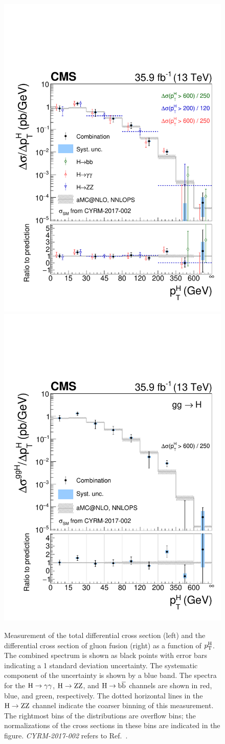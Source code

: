 \begin{figure}[hbtp]
  \begin{center}
    \includegraphics[width=0.49\linewidth]{img/differentials/spectra_pth_smH.pdf}
    \includegraphics[width=0.49\linewidth]{img/differentials/spectra_pth_ggH.pdf}
    \caption{
        Measurement of the total differential cross section (left) and the differential cross section of gluon fusion (right) as a function of $p_\mathrm{T}^\mathrm{H}$. The combined spectrum is shown as black points with error bars indicating a 1 standard deviation uncertainty. The systematic component of the uncertainty is shown by a blue band. The spectra for the $\mathrm{H}\to\mathrm{\gamma}\mathrm{\gamma}$, $\mathrm{H}\to\mathrm{Z}\mathrm{Z}$, and $\mathrm{H}\to\mathrm{b}\overline{\mathrm{b}}$ channels are shown in red, blue, and green, respectively.
        The dotted horizontal lines in the $\mathrm{H}\to\mathrm{Z}\mathrm{Z}$ channel indicate the coarser binning of this measurement.
        The rightmost bins of the distributions are overflow bins; the normalizations of the cross sections in these bins are indicated in the figure.
        \textit{CYRM-2017-002} refers to Ref.~\cite{deFlorian:2016spz}.
        }
    \label{fig:CombinedSpectra_pth}
  \end{center}
\end{figure}

